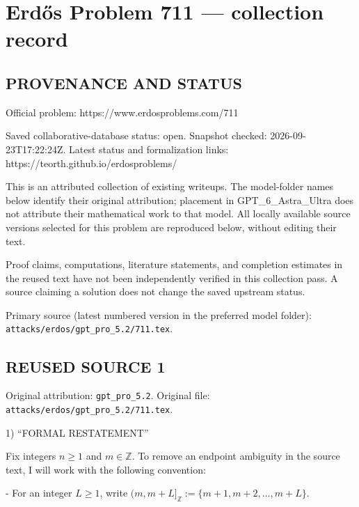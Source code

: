 \section*{Erd\H{o}s Problem 711 --- collection record}

\subsection*{PROVENANCE AND STATUS}
Official problem: https://www.erdosproblems.com/711

Saved collaborative-database status: open.
Snapshot checked: 2026-09-23T17:22:24Z.
Latest status and formalization links: https://teorth.github.io/erdosproblems/

This is an attributed collection of existing writeups. The model-folder names below identify their original attribution; placement in GPT\_6\_Astra\_Ultra does not attribute their mathematical work to that model. All locally available source versions selected for this problem are reproduced below, without editing their text.

Proof claims, computations, literature statements, and completion estimates in the reused text have not been independently verified in this collection pass. A source claiming a solution does not change the saved upstream status.

Primary source (latest numbered version in the preferred model folder): \texttt{attacks/erdos/gpt\_pro\_5.2/711.tex}.

\subsection*{REUSED SOURCE 1}
Original attribution: \texttt{gpt\_pro\_5.2}.
Original file: \texttt{attacks/erdos/gpt\_pro\_5.2/711.tex}.


1) “FORMAL RESTATEMENT”

Fix integers $n\ge 1$ and $m\in\mathbb Z$. To remove an endpoint ambiguity in the source text, I will work with the following convention:

- For an integer $L\ge 1$, write $(m,m+L]_{\mathbb Z}:=\{m+1,m+2,\dots,m+L\}$.

